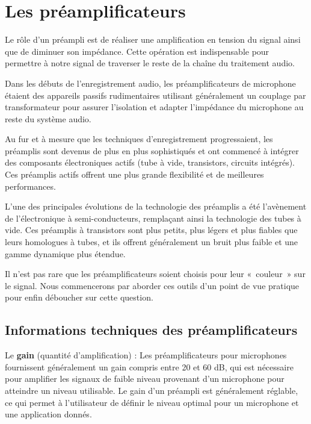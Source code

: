 \documentclass[
  letterpaper,
  DIV=11,
  numbers=noendperiod]{scrreprt}
\begin{document}
\hypertarget{les-pruxe9amplificateurs}{%
\chapter{Les préamplificateurs}\label{les-pruxe9amplificateurs}}

Le rôle d'un préampli est de réaliser une amplification en tension du
signal ainsi que de diminuer son impédance. Cette opération est
indispensable pour permettre à notre signal de traverser le reste de la
chaîne du traitement audio.

Dans les débuts de l'enregistrement audio, les préamplificateurs de
microphone étaient des appareils passifs rudimentaires utilisant
généralement un couplage par transformateur pour assurer l'isolation et
adapter l'impédance du microphone au reste du système audio.

Au fur et à mesure que les techniques d'enregistrement progressaient,
les préamplis sont devenus de plus en plus sophistiqués et ont commencé
à intégrer des composants électroniques actifs (tube à vide,
transistors, circuits intégrés). Ces préamplis actifs offrent une plus
grande flexibilité et de meilleures performances.

L'une des principales évolutions de la technologie des préamplis a été
l'avènement de l'électronique à semi-conducteurs, remplaçant ainsi la
technologie des tubes à vide. Ces préamplis à transistors sont plus
petits, plus légers et plus fiables que leurs homologues à tubes, et ils
offrent généralement un bruit plus faible et une gamme dynamique plus
étendue.

Il n'est pas rare que les préamplificateurs soient choisis pour leur
«~couleur~» sur le signal. Nous commencerons par aborder ces outils d'un
point de vue pratique pour enfin déboucher sur cette question.

\hypertarget{informations-techniques-des-pruxe9amplificateurs}{%
\section{Informations techniques des
préamplificateurs}\label{informations-techniques-des-pruxe9amplificateurs}}

Le \textbf{gain} (quantité d'amplification) : Les préamplificateurs pour
microphones fournissent généralement un gain compris entre 20 et 60 dB,
qui est nécessaire pour amplifier les signaux de faible niveau provenant
d'un microphone pour atteindre un niveau utilisable. Le gain d'un
préampli est généralement réglable, ce qui permet à l'utilisateur de
définir le niveau optimal pour un microphone et une application donnés.
\end{document}

